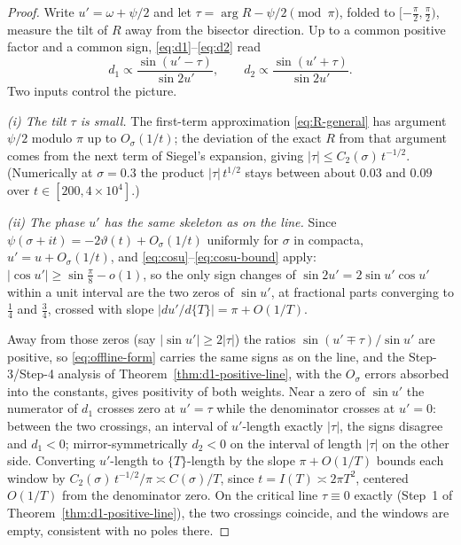 \documentclass[11pt]{article}
\theoremstyle{definition}
\begin{document}
\begin{proof}
Write $u'=\omega+\psi/2$ and let $\tau=\arg R-\psi/2\pmod\pi$, folded to
$[-\tfrac\pi2,\tfrac\pi2)$, measure the tilt of $R$ away from the bisector
direction. Up to a common positive factor and a common sign,
\eqref{eq:d1}--\eqref{eq:d2} read
\begin{equation}\label{eq:offline-form}
d_1\propto\frac{\sin(u'-\tau)}{\sin 2u'},
\qquad
d_2\propto\frac{\sin(u'+\tau)}{\sin 2u'}.
\end{equation}
Two inputs control the picture.

\emph{(i) The tilt $\tau$ is small.} The first-term approximation
\eqref{eq:R-general} has argument $\psi/2$ modulo $\pi$ up to
$O_\sigma(1/t)$; the deviation of the exact $R$ from that argument comes
from the next term of Siegel's expansion, giving
$|\tau|\leq C_2(\sigma)\,t^{-1/2}$. (Numerically at $\sigma=0.3$ the
product $|\tau|\,t^{1/2}$ stays between about $0.03$ and $0.09$ over
$t\in[200,4\times10^{4}]$.)

\emph{(ii) The phase $u'$ has the same skeleton as on the line.} Since
$\psi(\sigma+it)=-2\vartheta(t)+O_\sigma(1/t)$ uniformly for $\sigma$ in
compacta, $u'=u+O_\sigma(1/t)$, and \eqref{eq:cosu}--\eqref{eq:cosu-bound}
apply: $|\cos u'|\geq\sin\tfrac\pi8-o(1)$, so the only sign changes of
$\sin2u'=2\sin u'\cos u'$ within a unit interval are the two zeros of
$\sin u'$, at fractional parts converging to $\tfrac14$ and $\tfrac34$,
crossed with slope $|du'/d\{T\}|=\pi+O(1/T)$.

Away from those zeros (say $|\sin u'|\geq2|\tau|$) the ratios
$\sin(u'\mp\tau)/\sin u'$ are positive, so \eqref{eq:offline-form} carries
the same signs as on the line, and the Step-3/Step-4 analysis of
Theorem~\ref{thm:d1-positive-line}, with the $O_\sigma$ errors absorbed
into the constants, gives positivity of both weights. Near a zero of
$\sin u'$ the numerator of $d_1$ crosses zero at $u'=\tau$ while the
denominator crosses at $u'=0$: between the two crossings, an interval of
$u'$-length exactly $|\tau|$, the signs disagree and $d_1<0$;
mirror-symmetrically $d_2<0$ on the interval of length $|\tau|$ on the
other side. Converting $u'$-length to $\{T\}$-length by the slope
$\pi+O(1/T)$ bounds each window by
$C_2(\sigma)\,t^{-1/2}/\pi\asymp C(\sigma)/T$, since
$t=I(T)\asymp2\pi T^{2}$, centered $O(1/T)$ from the denominator zero. On the
critical line $\tau\equiv0$ exactly (Step~1 of
Theorem~\ref{thm:d1-positive-line}), the two crossings coincide, and the
windows are empty, consistent with no poles there.
\end{proof}
\end{document}
